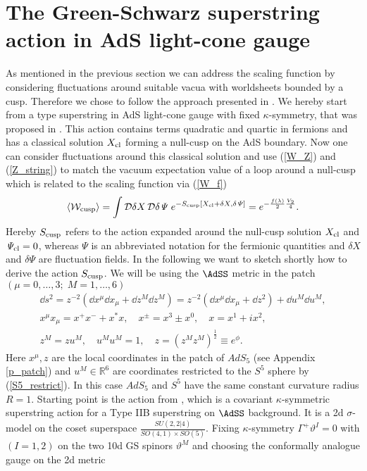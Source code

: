 \section{The Green-Schwarz superstring action in AdS light-cone gauge}
As mentioned in the previous section we can address the scaling function by considering fluctuations around suitable vacua with worldsheets bounded by a cusp. Therefore we chose to follow the approach presented in \cite{Giombi:2009gd}. We hereby start from a  type superstring in AdS light-cone gauge with fixed $\kappa$-symmetry, that was proposed in \cite{Metsaev:2000yf,Metsaev:2000yu}. This action contains terms quadratic and quartic in fermions and has a classical solution $X_{\rm cl}$ forming a null-cusp on the AdS boundary. Now one can consider fluctuations around this classical solution and use (\ref{W_Z}) and (\ref{Z_string}) to match the vacuum expectation value of a  loop around a null-cusp which is related to the scaling function via (\ref{W_f})
%
%
\begin{equation}
\langle \mathcal{W}_{\rm cusp} \rangle = \int \mathcal{D}\delta X\, \mathcal{D}\delta \mathit{\Psi}\; e^{-S_{\rm cusp}[X_{\rm cl} + \delta X,\delta \mathit{\Psi}]} = e^{-\frac{f(\lambda)}{2}\frac{V_{2}}{4}}.
\label{eq: W_S_cusp}
\end{equation}
%
%
Hereby $S_{\rm cusp}$ refers to the action expanded around the null-cusp solution $X_{\rm cl}$ and $\mathit{\Psi}_{\rm cl} = 0$, whereas $\mathit{\Psi}$ is an abbreviated notation for the fermionic quantities and $\delta X$ and $\delta\mathit{\Psi}$ are fluctuation fields. In the following we want to sketch shortly how to derive the action $S_{\rm cusp}$. We will be using the $\AdSS$ metric in the  patch $(\mu = 0,\ldots,3; \; M=1,\ldots,6)$
%
%
\begin{gather}
\dd s^{2} = z^{-2}\left( \dd x^{\mu}\dd x_{\mu} + \dd z^{M} \dd z^{M} \right) = z^{-2} \left(\dd x^{\mu}\dd x_{\mu} + \dd z^{2}\right) + \dd u^{M}\dd u^{M}, \\
x^{\mu}x_{\mu} = x^{+}x^{-} + x^{*}x, \quad x^{\pm} = x^{3}\pm x^{0}, \quad  x = x^{1} +ix^{2}, \\
z^{M} = zu^{M}, \quad  u^{M}u^{M} = 1, \quad  z=\left(z^{M}z^{M}\right)^{\frac{1}{2}} \equiv e^{\phi}. \label{S5_restrict}
\end{gather}
%
%
Here $x^{\mu},z$ are the local coordinates in the  patch of $AdS_{5}$ (see Appendix \ref{p_patch}) and $u^{M}\in \mathbb{R}^{6}$ are  coordinates restricted to the $S^{5}$ sphere by (\ref{S5_restrict}). In this case $AdS_{5}$ and $S^{5}$ have the same constant curvature radius $R=1$. Starting point is the action from \cite{Metsaev:1998it}, which is a covariant $\kappa$-symmetric superstring action for a Type IIB superstring on $\AdSS$ background. It is a 2d $\sigma$-model on the coset superspace $\frac{SU(2,2\vert 4)}{SO(4,1)\times SO(5)}$. Fixing $\kappa$-symmetry $\Gamma^{+}\vartheta^{I}=0$ with $(I=1,2)$ on the two 10d  GS spinors $\vartheta^{M}$  and choosing the conformally analogue gauge on the 2d metric
